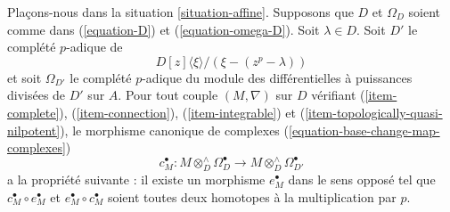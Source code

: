 \begin{lemma}
\label{lemma-computation}
Plaçons-nous dans la situation \ref{situation-affine}. Supposons que $D$ et $\Omega_D$ soient comme dans
(\ref{equation-D}) et (\ref{equation-omega-D}).
Soit $\lambda \in D$. Soit $D'$ le complété $p$-adique de
$$
D[z]\langle \xi \rangle/(\xi - (z^p - \lambda))
$$
et soit $\Omega_{D'}$ le complété $p$-adique du module des
différentielles à puissances divisées de $D'$ sur $A$. Pour tout couple $(M, \nabla)$
sur $D$ vérifiant (\ref{item-complete}), (\ref{item-connection}),
(\ref{item-integrable}) et (\ref{item-topologically-quasi-nilpotent}),
le morphisme canonique de complexes (\ref{equation-base-change-map-complexes})
$$
c_M^\bullet : M \otimes_D^\wedge \Omega^\bullet_D
\longrightarrow
M \otimes_D^\wedge \Omega^\bullet_{D'}
$$
a la propriété suivante : il existe un morphisme $e_M^\bullet$
dans le sens opposé tel que $c_M^\bullet \circ e_M^\bullet$
et $e_M^\bullet \circ c_M^\bullet$ soient toutes deux homotopes à la multiplication par $p$.
\end{lemma}

